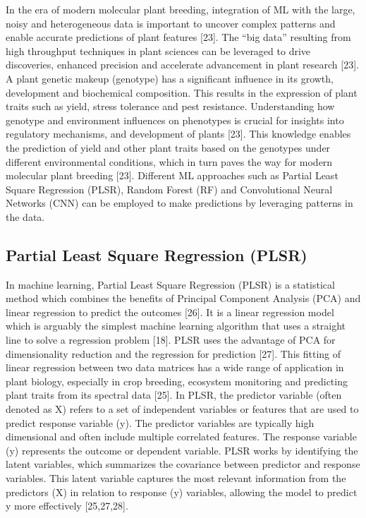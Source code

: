 \documentclass[12pt,a4paper]{report}
\begin{document}
In the era of modern molecular plant breeding, integration of ML with the large, noisy and heterogeneous data is important to uncover complex patterns and enable accurate predictions of plant features [23]. The “big data” resulting from high throughput techniques in plant sciences can be leveraged 
to drive discoveries, enhanced precision and accelerate advancement in plant research [23]. A plant genetic makeup (genotype) has a significant influence in its growth, development and biochemical composition. This results in the expression of plant traits such as yield, stress tolerance and pest resistance. 
Understanding how genotype and environment influences on phenotypes is crucial for insights into regulatory mechanisms, and development of plants [23]. This knowledge enables the  prediction of yield and other plant traits based on the genotypes under different environmental conditions, which in turn paves the 
way for modern molecular plant breeding [23]. Different ML approaches such as Partial Least Square Regression (PLSR), Random Forest (RF) and Convolutional Neural Networks (CNN)  can be employed to make predictions by leveraging patterns in the data. \\

\subsection{Partial Least Square Regression (PLSR)}
In machine learning, Partial Least Square Regression (PLSR) is a statistical method which combines the benefits of Principal Component Analysis (PCA) and linear regression to predict the outcomes [26]. It is a linear regression model which is arguably the simplest machine learning algorithm that uses a straight line to solve a regression problem [18]. PLSR uses the advantage of PCA for dimensionality reduction and the regression for prediction [27].
This fitting of linear regression between two data matrices has a wide range of application in plant biology, especially in crop breeding, ecosystem monitoring and predicting plant traits from its spectral data [25]. In PLSR, the predictor variable (often denoted as X) refers to a set of independent 
variables or features that are used to predict response variable (y). The predictor variables are typically high dimensional and often include multiple correlated features. The response variable (y) represents the outcome or dependent variable. PLSR works by identifying the latent variables, which 
summarizes the covariance between predictor and response variables. This latent variable captures the most relevant information from the predictors (X) in relation to response (y) variables, allowing the model to predict y more effectively [25,27,28]. \\
\end{document}
